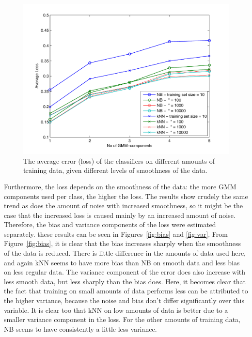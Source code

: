 \documentclass[a4paper]{article}
\begin{document}
\begin{figure}[H!]
    \centering
    \includegraphics[width=.9\textwidth]{loss_vs.pdf}
    \caption{The average error (loss) of the classifiers on different amounts of training data, given different levels of smoothness of the data. \label{fig:loss}}
\end{figure}

Furthermore, the loss depends on the smoothness of the data: the more GMM components used per class, the higher the loss. The results show crudely the same trend as does the amount of noise with increased smoothness, so it might be the case that the increased loss is caused mainly by an increased amount of noise. Therefore, the bias and variance components of the loss were estimated separately. these results can be seen in Figures~\ref{fig:bias} and \ref{fig:var}. From Figure~\ref{fig:bias}, it is clear that the bias increases sharply when the smoothness of the data is reduced. There is little difference in the amounts of data used here, and again kNN seems to have more bias than NB on smooth data and less bias on less regular data. The variance component of the error does also increase with less smooth data, but less sharply than the bias does. Here, it becomes clear that the fact that training on small amounts of data performs less can be attributed to the higher variance, because the noise and bias don't differ significantly over this variable. It is clear too that kNN on low amounts of data is better due to a smaller variance component in the loss. For the other amounts of training data, NB seems to have consistently a little less variance.
\end{document}
